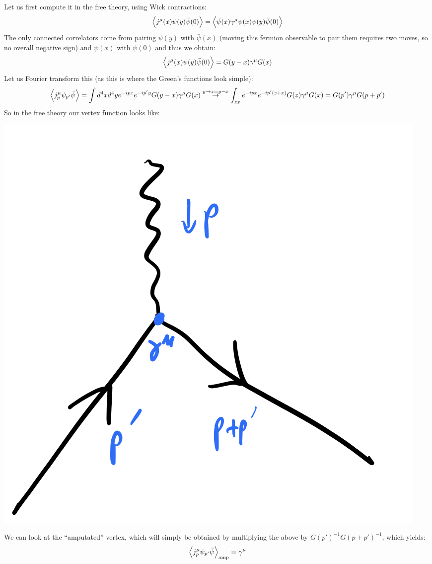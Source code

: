 Let us first compute it in the free theory, using Wick contractions:
\begin{equation}
    \left< j^\mu(x) \psi(y)\bar{\psi}(0) \right> = \left< \bar{\psi}(x)\gamma^\mu \psi(x)\psi(y)\bar{\psi}(0) \right>
\end{equation}
The only connected correlators come from pairing $\psi(y)$ with $\bar{\psi}(x)$ (moving this fermion observable to pair them requires two moves, so no overall negative sign) and $\psi(x)$ with $\bar{\psi}(0)$ and thus we obtain:
\begin{equation}
    \left< j^\mu(x) \psi(y)\bar{\psi}(0) \right> = G(y-x)\gamma^\mu G(x)
\end{equation}
Let us Fourier transform this (as this is where the Green's functions look simple):
\begin{equation}
    \left< j^\mu_p \psi_{p'}\bar{\psi} \right> = \int d^4x d^4y e^{-ipx}e^{-ip'y}G(y - x)\gamma^\mu G(x) \stackrel{y \to z = y-x}{\to} \int_{zx} e^{-ipx}e^{-ip'(z + x)}G(z)\gamma^\mu G(x) = G(p')\gamma^\mu G(p + p')
\end{equation}
So in the free theory our vertex function looks like:

\begin{center}
    \includegraphics[scale=0.35]{Lectures/Images/lec9-free.png}
\end{center}

We can look at the ``amputated'' vertex, which will simply be obtained by multiplying the above by $G(p')^{-1} G(p+p')^{-1}$, which yields:
\begin{equation}
    \left< j^\mu_p \psi_{p'}\bar{\psi} \right>_{\text{amp}} = \gamma^\mu
\end{equation}

